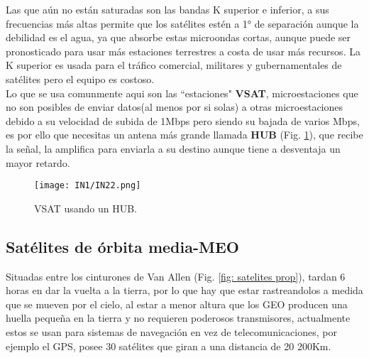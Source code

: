 \documentclass[
	12pt, %
	fleqn, %
	a4paper, %
	oneside, %
]{LegrandOrangeBook}
\begin{document}
Las que aún no están saturadas son las bandas K superior e inferior, a sus frecuencias más altas permite que los satélites estén a 1° de separación aunque la debilidad es el agua, ya que absorbe estas microondas cortas, aunque puede ser pronosticado para usar más estaciones terrestres a costa de usar más recursos. La K superior es usada para el tráfico comercial, militares y gubernamentales de satélites pero el equipo es costoso.\\
Lo que se usa comunmente aqui son las ``estaciones" \textbf{VSAT}, microestaciones que no son posibles de enviar datos(al menos por si solas) a otras microestaciones debido a su velocidad de subida de 1Mbps pero siendo su bajada de varios Mbps, es por ello que necesitas un antena más grande llamada \textbf{HUB} (Fig. \ref{fig: vsat hub}), que recibe la señal, la amplifica para enviarla a su destino aunque tiene a desventaja un mayor retardo.
\begin{figure}[H]
\centering
\texttt{[image: IN1/IN22.png]}
\caption{VSAT usando un HUB.}
\label{fig: vsat hub}
\end{figure}
\subsection{Satélites de órbita media-MEO}
Situadas entre los cinturones de Van Allen (Fig. \ref{fig: satelites prop}), tardan 6 horas en dar la vuelta a la tierra, por lo que hay que estar rastreandolos a medida que se mueven por el cielo, al estar a menor altura que los GEO producen una huella pequeña en la tierra y no requieren poderosos transmisores, actualmente estos se usan para sistemas de navegación en vez de telecomunicaciones, por ejemplo el GPS, posee 30 satélites que giran a una distancia de 20 200Km.
\end{document}
